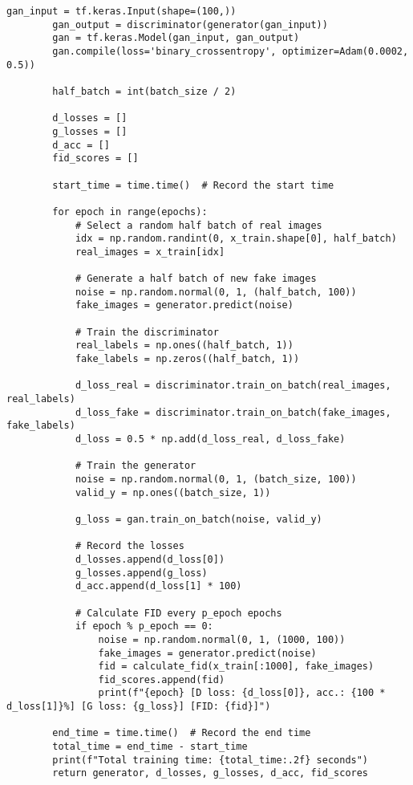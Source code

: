 \begin{lstlisting}[style=mypython, caption=Explore GAN with more convolutional layers 5]
        gan_input = tf.keras.Input(shape=(100,))
        gan_output = discriminator(generator(gan_input))
        gan = tf.keras.Model(gan_input, gan_output)
        gan.compile(loss='binary_crossentropy', optimizer=Adam(0.0002, 0.5))
    
        half_batch = int(batch_size / 2)
        
        d_losses = []
        g_losses = []
        d_acc = []
        fid_scores = []
        
        start_time = time.time()  # Record the start time
    
        for epoch in range(epochs):
            # Select a random half batch of real images
            idx = np.random.randint(0, x_train.shape[0], half_batch)
            real_images = x_train[idx]
    
            # Generate a half batch of new fake images
            noise = np.random.normal(0, 1, (half_batch, 100))
            fake_images = generator.predict(noise)
    
            # Train the discriminator
            real_labels = np.ones((half_batch, 1))
            fake_labels = np.zeros((half_batch, 1))
    
            d_loss_real = discriminator.train_on_batch(real_images, real_labels)
            d_loss_fake = discriminator.train_on_batch(fake_images, fake_labels)
            d_loss = 0.5 * np.add(d_loss_real, d_loss_fake)
    
            # Train the generator
            noise = np.random.normal(0, 1, (batch_size, 100))
            valid_y = np.ones((batch_size, 1))
    
            g_loss = gan.train_on_batch(noise, valid_y)
    
            # Record the losses
            d_losses.append(d_loss[0])
            g_losses.append(g_loss)
            d_acc.append(d_loss[1] * 100)
            
            # Calculate FID every p_epoch epochs
            if epoch % p_epoch == 0:
                noise = np.random.normal(0, 1, (1000, 100))
                fake_images = generator.predict(noise)
                fid = calculate_fid(x_train[:1000], fake_images)
                fid_scores.append(fid)
                print(f"{epoch} [D loss: {d_loss[0]}, acc.: {100 * d_loss[1]}%] [G loss: {g_loss}] [FID: {fid}]")
    
        end_time = time.time()  # Record the end time
        total_time = end_time - start_time
        print(f"Total training time: {total_time:.2f} seconds")
        return generator, d_losses, g_losses, d_acc, fid_scores
\end{lstlisting}

